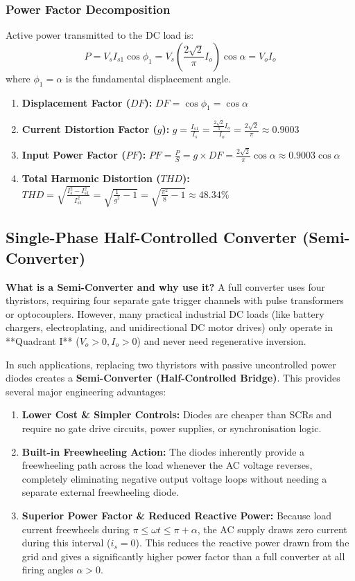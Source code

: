 \documentclass[11pt,a4paper]{article}
\renewcommand{\boxed}[1]{#1}
\begin{document}
\subsubsection{Power Factor Decomposition}
Active power transmitted to the DC load is:
\[
P = V_s I_{s1} \cos\phi_1 = V_s \left(\frac{2\sqrt{2}}{\pi} I_o\right) \cos\alpha = V_o I_o
\]
where $\phi_1 = \alpha$ is the fundamental displacement angle.
\begin{formulabox}
\begin{enumerate}[leftmargin=*]
  \item \textbf{Displacement Factor ($DF$):} $DF = \cos\phi_1 = \cos\alpha$
  \item \textbf{Current Distortion Factor ($g$):} $g = \frac{I_{s1}}{I_s} = \frac{\frac{2\sqrt{2}}{\pi} I_o}{I_o} = \frac{2\sqrt{2}}{\pi} \approx 0.9003$
  \item \textbf{Input Power Factor ($PF$):} $PF = \frac{P}{S} = g \times DF = \boxed{\frac{2\sqrt{2}}{\pi} \cos\alpha \approx 0.9003 \cos\alpha}$
  \item \textbf{Total Harmonic Distortion ($THD$):} $THD = \sqrt{\frac{I_s^2 - I_{s1}^2}{I_{s1}^2}} = \sqrt{\frac{1}{g^2} - 1} = \sqrt{\frac{\pi^2}{8} - 1} \approx \boxed{48.34\%}$
\end{enumerate}
\end{formulabox}

\subsection{Single-Phase Half-Controlled Converter (Semi-Converter)}

\textbf{What is a Semi-Converter and why use it?}
A full converter uses four thyristors, requiring four separate gate trigger channels with pulse transformers or optocouplers. However, many practical industrial DC loads (like battery chargers, electroplating, and unidirectional DC motor drives) only operate in **Quadrant I** ($V_o > 0, I_o > 0$) and never need regenerative inversion. 

In such applications, replacing two thyristors with passive uncontrolled power diodes creates a \textbf{Semi-Converter (Half-Controlled Bridge)}. This provides several major engineering advantages:
\begin{enumerate}[leftmargin=*]
  \item \textbf{Lower Cost \& Simpler Controls:} Diodes are cheaper than SCRs and require no gate drive circuits, power supplies, or synchronisation logic.
  \item \textbf{Built-in Freewheeling Action:} The diodes inherently provide a freewheeling path across the load whenever the AC voltage reverses, completely eliminating negative output voltage loops without needing a separate external freewheeling diode.
  \item \textbf{Superior Power Factor \& Reduced Reactive Power:} Because load current freewheels during $\pi \le \omega t \le \pi+\alpha$, the AC supply draws zero current during this interval ($i_s = 0$). This reduces the reactive power drawn from the grid and gives a significantly higher power factor than a full converter at all firing angles $\alpha > 0$.
\end{enumerate}
\end{document}
